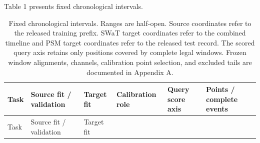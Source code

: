 \documentclass[pdflatex,sn-apa]{sn-jnl}
\begin{document}
Table 1 presents fixed chronological intervals.

\begin{longtable}[]{@{}
  >{\raggedright\arraybackslash}p{}
  >{\raggedright\arraybackslash}p{}
  >{\raggedright\arraybackslash}p{}
  >{\raggedright\arraybackslash}p{}
  >{\raggedright\arraybackslash}p{}
  >{\raggedleft\arraybackslash}p{}@{}}
\caption{Fixed chronological intervals. Ranges are half-open. Source
coordinates refer to the released training prefix. SWaT target
coordinates refer to the combined timeline and PSM target coordinates
refer to the released test record. The scored query axis retains only
positions covered by complete legal windows. Frozen window alignments,
channels, calibration point selection, and excluded tails are documented
in Appendix A.}\tabularnewline
\toprule\noalign{}
\begin{minipage}[b]{\linewidth}\raggedright
Task
\end{minipage} & \begin{minipage}[b]{\linewidth}\raggedright
Source fit / validation
\end{minipage} & \begin{minipage}[b]{\linewidth}\raggedright
Target fit
\end{minipage} & \begin{minipage}[b]{\linewidth}\raggedright
Calibration role
\end{minipage} & \begin{minipage}[b]{\linewidth}\raggedright
Query score axis
\end{minipage} & \begin{minipage}[b]{\linewidth}\raggedleft
Points / complete events
\end{minipage} \\
\midrule\noalign{}
\endfirsthead
\toprule\noalign{}
\begin{minipage}[b]{\linewidth}\raggedright
Task
\end{minipage} & \begin{minipage}[b]{\linewidth}\raggedright
Source fit / validation
\end{minipage} & \begin{minipage}[b]{\linewidth}\raggedright
Target fit
\end{minipage} & \begin{minipage}[b]{\linewidth}\raggedright

\end{minipage}
\end{longtable}
\end{document}

